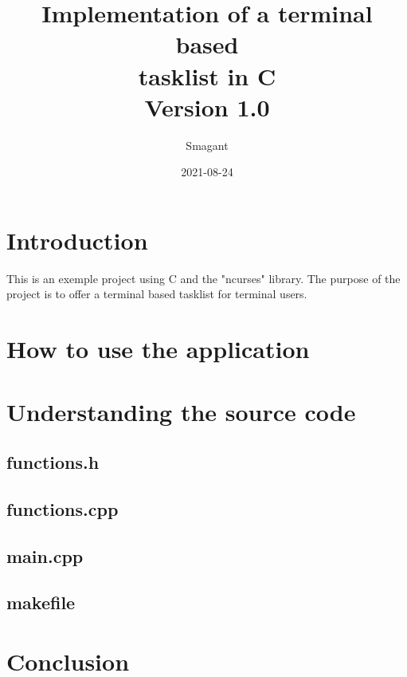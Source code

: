 \documentclass{article}
\title{%
  Implementation of a terminal based \\
  tasklist in C \\
  \large Version 1.0}
\date{2021-08-24}
\author{Smagant}
\begin{document}
    \maketitle
    \newpage
    
    \section{Introduction}
    
    This is an exemple project using C and the "ncurses" library.
    The purpose of the project is to offer a terminal based tasklist for terminal users. 
    
    \section{How to use the application}

    \section{Understanding the source code}

    \subsection{functions.h}

    \subsection{functions.cpp}
    
    \subsection{main.cpp}

    \subsection{makefile}

    \section{Conclusion}
\end{document}
